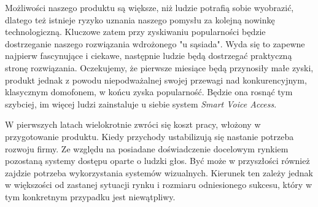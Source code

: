 \documentclass[../main.tex]{subfiles}
\begin{document}
{    Możliwości naszego produktu są większe, niż ludzie potrafią sobie wyobrazić, dlatego też
    istnieje ryzyko uznania naszego pomysłu za kolejną nowinkę technologiczną. Kluczowe zatem przy
    zyskiwaniu popularności będzie dostrzeganie naszego rozwiązania wdrożonego "u sąsiada". Wyda się
    to zapewne najpierw fascynujące i ciekawe, następnie ludzie będą dostrzegać praktyczną stronę
    rozwiązania. Oczekujemy, że pierwsze miesiące będą przynosiły małe zyski, produkt jednak z
    powodu niepodważalnej swojej przewagi nad konkurencyjnym, klasycznym domofonem, w końcu zyska
    popularność. Będzie ona rosnąć tym szybciej, im więcej ludzi zainstaluje u siebie system
    \emph{Smart Voice Access}.

    W pierwszych latach wielokrotnie zwróci się koszt pracy, włożony w przygotowanie produktu. Kiedy
    przychody ustabilizują się nastanie potrzeba rozwoju firmy. Ze względu na posiadane
    doświadczenie docelowym rynkiem pozostaną systemy dostępu oparte o ludzki głos. Być może w
    przyszłości również zajdzie potrzeba wykorzystania systemów wizualnych. Kierunek ten zależy
    jednak w większości od zastanej sytuacji rynku i rozmiaru odniesionego sukcesu, który w tym
    konkretnym przypadku jest niewątpliwy.

}
\end{document}
